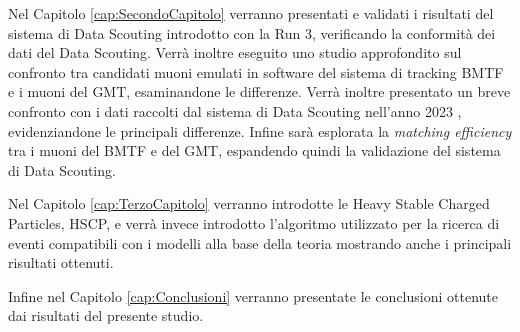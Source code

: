 Nel Capitolo \ref{cap:SecondoCapitolo} verranno presentati e validati i risultati del sistema di Data Scouting introdotto con la Run 3, verificando la conformità dei dati del Data Scouting. Verrà inoltre eseguito uno studio approfondito sul confronto tra candidati muoni emulati in software del sistema di tracking BMTF e i muoni del GMT, esaminandone le differenze. Verrà inoltre presentato un breve confronto con i dati raccolti dal sistema di Data Scouting nell'anno 2023 \cite{CERNsummerSchool}, evidenziandone le principali differenze. Infine sarà esplorata la \textit{matching efficiency} tra i muoni del BMTF e del GMT, espandendo quindi la validazione del sistema di Data Scouting.

Nel Capitolo \ref{cap:TerzoCapitolo} verranno introdotte le Heavy Stable Charged Particles, HSCP, e verrà invece introdotto l'algoritmo utilizzato per la ricerca di eventi compatibili con i modelli alla base della teoria mostrando anche i principali risultati ottenuti.

Infine nel Capitolo \ref{cap:Conclusioni} verranno presentate le conclusioni ottenute dai risultati del presente studio. 

